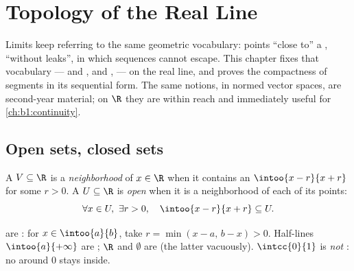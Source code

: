 \chapter{Topology of the Real Line}\label{ch:b1:topology}

Limits keep referring to the same geometric vocabulary: points
``close to'' a ,  ``without  leaks'',  in
which sequences cannot escape. This chapter fixes that vocabulary ---
 and ,  and ,  --- on the real
line, and proves the compactness of segments in its sequential form.
The same notions, in normed vector spaces, are second-year material;
on $\R$ they are within reach and immediately useful for
\cref{ch:b1:continuity}.

\section{Open sets, closed sets}

\begin{definition}\label{def:b1:topology:open}
A  $V \subseteq \R$ is a \emph{neighborhood}
of $x \in \R$ when it contains an  $\intoo{x - r}{x + r}$ for
some $r > 0$. A  $U \subseteq \R$ is \emph{open}
when it is a neighborhood of each of its points:
\[
\forall x \in U,\ \exists r > 0, \quad \intoo{x - r}{x + r}
\subseteq U .
\]
\end{definition}

\begin{example}\label{ex:b1:topology:open}
  are : for $x \in \intoo{a}{b}$, take $r = \min(x -
a,\, b - x) > 0$. Half-lines $\intoo{a}{+\infty}$ are ; $\R$ and
$\emptyset$ are  (the latter vacuously). $\intcc{0}{1}$ is
\emph{not} : no  around $0$ stays inside.
\end{example}

